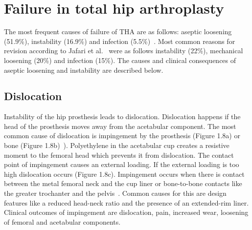 \documentclass[whitelogo]{tudelft-report}
\begin{document}
{\section{Failure in total hip arthroplasty}
The most frequent causes of failure of THA are as follows: aseptic loosening (51.9\%), instability (16.9\%) and infection (5.5\%)~\cite{ulrich2008total}. Most common reasons for revision according to Jafari et al.~\cite{jafari2010revision} were as follows instability (22\%), mechanical loosening (20\%) and infection (15\%). The causes and clinical consequences of aseptic loosening and instability are described below. 
\subsection{Dislocation}
Instability of the hip prosthesis leads to dislocation. Dislocation happens if the head of the prosthesis moves away from the acetabular component. The most common cause of dislocation is impingement by the prosthesis (Figure 1.8a) or bone (Figure 1.8b)~\cite{zahar2013dislocation}).
Polyethylene in the acetabular cup creates a resistive moment to the femoral head which prevents it from dislocation. The contact point of impingement causes an external loading. If the external loading is too high dislocation occurs (Figure 1.8c). %
Impingement occurs when there is contact between the metal femoral neck and the cup liner or bone-to-bone contacts like the greater trochanter and the pelvis~\cite{malik2007impingement}. Common causes for this are design features like a reduced head-neck ratio and the presence of an extended-rim liner.  
Clinical outcomes of impingement are dislocation, pain, increased wear, loosening of femoral and acetabular components.

}
\end{document}
